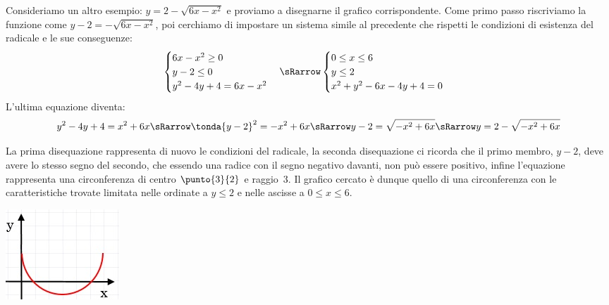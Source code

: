Consideriamo un altro esempio: $y=2-\sqrt{6x-x^{2}}  $ e proviamo a 
disegnarne il grafico corrispondente. Come primo passo riscriviamo la 
funzione come $y-2=-\sqrt{6x-x^{2}}  $, poi cerchiamo di impostare un 
sistema simile al precedente che rispetti le condizioni di esistenza del 
radicale e le sue conseguenze:
\[\begin{cases}  6x-x^{2}\geq0   \\ y-2\leq0  \\y^{2}-4y+4=6x-x^{2} 
\end{cases} \sRarrow
\begin{cases}   0\leq x\leq6   \\ y\leq2  \\ x^{2}+y^{2}-6x-4y+4=0 
\end{cases}\]
L'ultima equazione diventa:
\[y^{2}-4y+4=x^{2}+6x \sRarrow \tonda{y-2}^2 = - x^{2}+6x \sRarrow
y-2 = \sqrt{- x^{2}+6x} \sRarrow y=2-\sqrt{-x^{2} +6x}\]

\noindent \begin{minipage}{.75\textwidth}
La prima disequazione rappresenta di nuovo le condizioni del 
radicale, la seconda disequazione ci ricorda che il primo membro, \(y-2\), deve 
avere lo stesso segno del secondo, che essendo una radice con il segno 
negativo davanti, non può essere positivo, infine l'equazione rappresenta 
una circonferenza di 
centro \(\punto{3}{2}\) e raggio~3. Il grafico cercato è dunque quello di una 
circonferenza con le caratteristiche trovate limitata nelle ordinate a 
$y\leq2$ e nelle ascisse a $ 0\leq x\leq6 $.
  \end{minipage}
  \hfill
  \begin{minipage}{.2\textwidth}
    \includegraphics[width=\textwidth]{img/curva2.jpg}
  \end{minipage}

